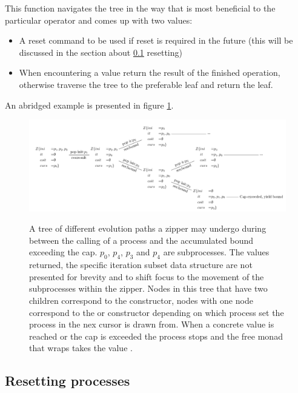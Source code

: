 This function navigates the tree in the way that is most beneficial to
the particular operator and comes up with two values:

\begin{itemize}
\item A reset command to be used if reset is required in the future
  (this will be discussed in the section about
  \ref{sec:process_resetting} resetting)
\item When encountering a  value return the result of the
finished operation, otherwise traverse the tree to the preferable
leaf and return the leaf.
\end{itemize}

An abridged example is presented in figure \ref{fig:cmds_tree}.

\begin{figure}[H]
\centering
\includegraphics[width=\textwidth]{./imgs/cmds_tree.pdf}
\label{fig:cmds_tree}
\caption{A tree of different evolution paths a
  zipper may undergo during between the calling of a process and the
  accumulated bound exceeding the cap. \(p_0\), \(p_4\), \(p_3\) and
  \(p_4\) are subprocesses. The values returned, the specific
  iteration subset data structure are not presented for brevity and to
  shift focus to the movement of the subprocesses within the
  zipper. Nodes in this tree that have two children correspond to the
   constructor, nodes with one node correspond to the
   or  constructor depending on which
  process set the process in the nex cursor is drawn from. When a
  concrete value is reached or the cap is exceeded the process stops
  and the free monad that wraps  takes the value
  .}
\end{figure}

\subsection{Resetting processes}
\label{sec:process_resetting}

